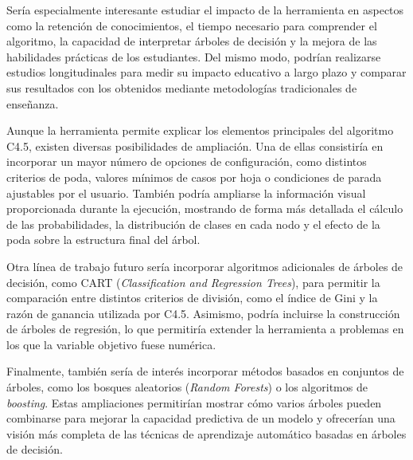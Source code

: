 Sería especialmente interesante estudiar el impacto de la herramienta en aspectos como la retención de conocimientos, el tiempo necesario para comprender el algoritmo, la capacidad de interpretar árboles de decisión y la mejora de las habilidades prácticas de los estudiantes. Del mismo modo, podrían realizarse estudios longitudinales para medir su impacto educativo a largo plazo y comparar sus resultados con los obtenidos mediante metodologías tradicionales de enseñanza.

Aunque la herramienta permite explicar los elementos principales del algoritmo C4.5, existen diversas posibilidades de ampliación. Una de ellas consistiría en incorporar un mayor número de opciones de configuración, como distintos criterios de poda, valores mínimos de casos por hoja o condiciones de parada ajustables por el usuario. También podría ampliarse la información visual proporcionada durante la ejecución, mostrando de forma más detallada el cálculo de las probabilidades, la distribución de clases en cada nodo y el efecto de la poda sobre la estructura final del árbol.

Otra línea de trabajo futuro sería incorporar algoritmos adicionales de árboles de decisión, como CART (\textit{Classification and Regression Trees}), para permitir la comparación entre distintos criterios de división, como el índice de Gini y la razón de ganancia utilizada por C4.5. Asimismo, podría incluirse la construcción de árboles de regresión, lo que permitiría extender la herramienta a problemas en los que la variable objetivo fuese numérica.

Finalmente, también sería de interés incorporar métodos basados en conjuntos de árboles, como los bosques aleatorios (\textit{Random Forests}) o los algoritmos de \textit{boosting}. Estas ampliaciones permitirían mostrar cómo varios árboles pueden combinarse para mejorar la capacidad predictiva de un modelo y ofrecerían una visión más completa de las técnicas de aprendizaje automático basadas en árboles de decisión.

